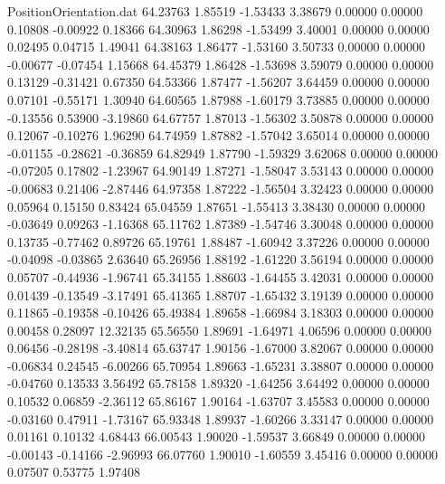 \begin{filecontents}{PositionOrientation.dat}
  64.23763    1.85519   -1.53433     3.38679    0.00000    0.00000    0.10808   -0.00922    0.18366
  64.30963    1.86298   -1.53499     3.40001    0.00000    0.00000    0.02495    0.04715    1.49041
  64.38163    1.86477   -1.53160     3.50733    0.00000    0.00000   -0.00677   -0.07454    1.15668
  64.45379    1.86428   -1.53698     3.59079    0.00000    0.00000    0.13129   -0.31421    0.67350
  64.53366    1.87477   -1.56207     3.64459    0.00000    0.00000    0.07101   -0.55171    1.30940
  64.60565    1.87988   -1.60179     3.73885    0.00000    0.00000   -0.13556    0.53900   -3.19860
  64.67757    1.87013   -1.56302     3.50878    0.00000    0.00000    0.12067   -0.10276    1.96290
  64.74959    1.87882   -1.57042     3.65014    0.00000    0.00000   -0.01155   -0.28621   -0.36859
  64.82949    1.87790   -1.59329     3.62068    0.00000    0.00000   -0.07205    0.17802   -1.23967
  64.90149    1.87271   -1.58047     3.53143    0.00000    0.00000   -0.00683    0.21406   -2.87446
  64.97358    1.87222   -1.56504     3.32423    0.00000    0.00000    0.05964    0.15150    0.83424
  65.04559    1.87651   -1.55413     3.38430    0.00000    0.00000   -0.03649    0.09263   -1.16368
  65.11762    1.87389   -1.54746     3.30048    0.00000    0.00000    0.13735   -0.77462    0.89726
  65.19761    1.88487   -1.60942     3.37226    0.00000    0.00000   -0.04098   -0.03865    2.63640
  65.26956    1.88192   -1.61220     3.56194    0.00000    0.00000    0.05707   -0.44936   -1.96741
  65.34155    1.88603   -1.64455     3.42031    0.00000    0.00000    0.01439   -0.13549   -3.17491
  65.41365    1.88707   -1.65432     3.19139    0.00000    0.00000    0.11865   -0.19358   -0.10426
  65.49384    1.89658   -1.66984     3.18303    0.00000    0.00000    0.00458    0.28097   12.32135
  65.56550    1.89691   -1.64971     4.06596    0.00000    0.00000    0.06456   -0.28198   -3.40814
  65.63747    1.90156   -1.67000     3.82067    0.00000    0.00000   -0.06834    0.24545   -6.00266
  65.70954    1.89663   -1.65231     3.38807    0.00000    0.00000   -0.04760    0.13533    3.56492
  65.78158    1.89320   -1.64256     3.64492    0.00000    0.00000    0.10532    0.06859   -2.36112
  65.86167    1.90164   -1.63707     3.45583    0.00000    0.00000   -0.03160    0.47911   -1.73167
  65.93348    1.89937   -1.60266     3.33147    0.00000    0.00000    0.01161    0.10132    4.68443
  66.00543    1.90020   -1.59537     3.66849    0.00000    0.00000   -0.00143   -0.14166   -2.96993
  66.07760    1.90010   -1.60559     3.45416    0.00000    0.00000    0.07507    0.53775    1.97408

\end{filecontents}
